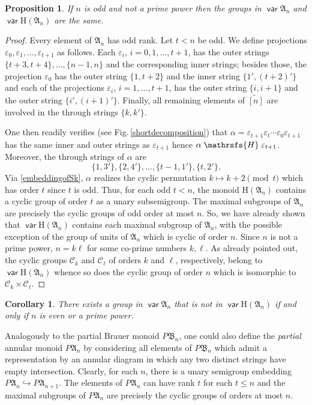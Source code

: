 \documentclass[11pt,reqno]{amsart}
\DeclareMathOperator{\var}{\mathsf{var}}
\numberwithin{equation}{section}
\newtheorem{Prop}[Thm]{Proposition}
\newtheorem{Cor}[Thm]{Corollary}
\theoremstyle{remark}
\def\Hc{\mathrsfs{H}}
\def\al{\alpha}
\def\ep{\varepsilon}
\def\H{\mathrm H}
\def\A{\mathfrak{A}}
\def\B{\mathfrak{B}}
\def\wt{\widetilde}
\begin{document}
\begin{Prop}
\label{noprimepowerodd} If $n$ is odd and not a prime power then
the groups in $\var\A_n$ and $\var\H(\A_n)$ are the same.
\end{Prop}
\begin{proof} Every element of $\A_n$ has odd rank. Let $t<n$ be odd.
We define projections $\ep_0,\ep_1,\dots,\ep_{t+1}$ as follows.
Each $\ep_i$, $i=0,1,\dots,t+1$, has the outer strings
$\{t+3,t+4\},\dots,\{n-1,n\}$ and the corresponding inner strings;
besides those, the projection $\ep_0$ has the outer string
$\{1,t+2\}$ and the inner string $\{1',(t+2)'\}$ and each of the
projections $\ep_i$, $i=1,\dots,t+1$, has the outer string
$\{i,i+1\}$ and the outer string $\{i',(i+1)'\}$. Finally, all
remaining elements of $\wt{[n]}$ are involved in the through
strings  $\{k,k'\}$.

One then readily verifies (see Fig.\,\ref{shortdecomposition})
that $\al=\ep_{t+1}\ep_t\cdots \ep_0\ep_{t+1}$ has the same inner
and outer strings as $\ep_{t+1}$ hence
$\al\mathrel{\Hc}\ep_{t+1}$. Moreover, the through strings of
$\al$ are
$$\{1,3'\},\{2,4'\},\dots,\{t-1,1'\},\{t,2'\}.$$
Via \eqref{embeddingofSk}, $\al$ realizes the cyclic permutation
$k\mapsto k+2\!\pmod{t}$ which has order $t$ since $t$ is odd.
Thus, for each odd $t<n$, the monoid $\H(\A_n)$ contains a cyclic
group of order $t$ as a unary subsemigroup. The maximal subgroups
of $\A_n$ are precisely the cyclic groups of odd order at most
$n$. So, we have already shown that $\var\H(\A_n)$ contains each
maximal subgroup of $\A_n$, with the possible exception of the
group of units of $\A_n$ which is cyclic of order $n$. Since $n$
is not a prime power, $n=k\ell$ for some co-prime numbers
$k,\ell$. As already pointed out, the cyclic groups
$\mathcal{C}_k$ and $\mathcal{C}_\ell$ of orders $k$ and $\ell$,
respectively, belong to $\var\H(\A_n)$ whence so does the cyclic
group of order $n$ which is isomorphic to $\mathcal{C}_k
\times\mathcal{C}_\ell$.
\end{proof}
\begin{Cor} There exists a group in $\var\A_n$ that is not in
$\var\H(\A_n)$ if and only if $n$ is even or a prime power.
\end{Cor}

Analogously to the partial Brauer monoid $P\B_n$, one could also
define the \emph{partial} annular monoid $P\A_n$  by considering
all elements of $P\B_n$ which admit a representation by an annular
diagram in which any two distinct strings have empty intersection.
Clearly, for each $n$, there is a unary semigroup embedding
$P\A_n\hookrightarrow P\A_{n+1}$. The elements of $P\A_n$ can have
rank $t$ for each $t\le n$ and the maximal subgroups of $P\A_n$
are precisely the cyclic groups of orders at most $n$.
\end{document}
